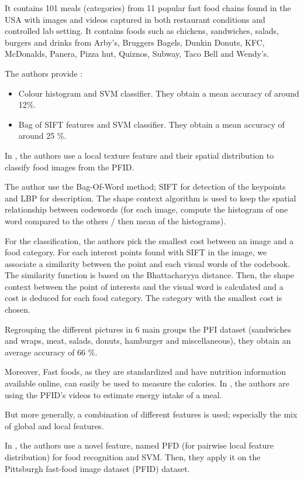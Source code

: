 It contains 101 meals (categories) from 11 popular fast food chains found in the USA with images and videos captured in both restaurant conditions and controlled lab setting. It contains foods such as chickens, sandwiches, salads, burgers and drinks from Arby's, Bruggers Bagels, Dunkin Donuts, KFC, McDonalds, Panera, Pizza hut, Quiznos, Subway, Taco Bell and Wendy's.

The authors provide :
\begin{itemize}
    \item Colour histogram and SVM classifier. They obtain a mean accuracy of around 12\%.
    \item Bag of SIFT features and SVM classifier. They obtain a mean accuracy of around 25 \%.
\end{itemize}

In \cite{Zong2010}, the authors use a local texture feature and their spatial distribution to classify food images from the PFID.

The author use the Bag-Of-Word method; SIFT for detection of the keypoints and LBP for description. The shape context algorithm is used to keep the spatial relationship between codewords (for each image, compute the histogram of one word compared to the others / then mean of the histograms).

For the classification, the authors pick the smallest cost between an image and a food category. For each interest points found with SIFT in the image, we associate a similarity between the point and each visual words of the codebook. The similarity function is based on the Bhattacharyya distance. Then, the shape context between the point of interests and the visual word is calculated and a cost is deduced for each food category. The category with the smallest cost is chosen.

Regrouping the different pictures in 6 main groups the PFI dataset (sandwiches and wraps, meat, salads, donuts, hamburger and miscellaneous), they obtain an average accuracy of 66 \%.

Moreover, Fast foods, as they are standardized and have nutrition information available online, can easily be used to measure the calories. In \cite{Wen2009}, the authors are using the PFID's videos to estimate energy intake of a meal.

But more generally, a combination of different features is used; especially the mix of global and local features.


In \cite{Yang2010}, the authors use a novel feature, named PFD (for pairwise local feature distribution) for food recognition and SVM. Then, they apply it on the Pittsburgh fast-food image dataset (PFID) dataset.

